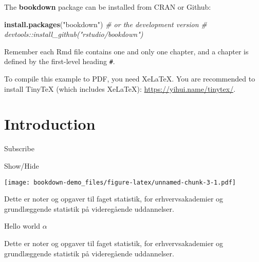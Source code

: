 \documentclass[]{book}
\newenvironment{Shaded}{\begin{snugshade}}{\end{snugshade}}
\newcommand{\CommentTok}[1]{\textcolor[rgb]{0.56,0.35,0.01}{\textit{#1}}}
\newcommand{\KeywordTok}[1]{\textcolor[rgb]{0.13,0.29,0.53}{\textbf{#1}}}
\newcommand{\NormalTok}[1]{#1}
\newcommand{\OperatorTok}[1]{\textcolor[rgb]{0.81,0.36,0.00}{\textbf{#1}}}
\newcommand{\StringTok}[1]{\textcolor[rgb]{0.31,0.60,0.02}{#1}}
\theoremstyle{definition}
\theoremstyle{definition}
\theoremstyle{definition}
\theoremstyle{remark}
\begin{document}
The \textbf{bookdown} package can be installed from CRAN or Github:

\begin{Shaded}
\begin{Highlighting}[]
\KeywordTok{install.packages}\NormalTok{(}\StringTok{"bookdown"}\NormalTok{)}
\CommentTok{# or the development version}
\CommentTok{# devtools::install_github("rstudio/bookdown")}
\end{Highlighting}
\end{Shaded}

Remember each Rmd file contains one and only one chapter, and a chapter
is defined by the first-level heading \texttt{\#}.

To compile this example to PDF, you need XeLaTeX. You are recommended to
install TinyTeX (which includes XeLaTeX):
\url{https://yihui.name/tinytex/}.

\hypertarget{intro}{%
\chapter{Introduction}\label{intro}}

Subscribe

Show/Hide

\hypertarget{BlockName}{}
\begin{Shaded}
\end{Shaded}

\texttt{[image: bookdown-demo\_files/figure-latex/unnamed-chunk-3-1.pdf]}

Dette er noter og opgaver til faget statistik, for erhvervsakademier og
grundlæggende statistik på videregående uddannelser.

\leavevmode\hypertarget{BlockName3}{}%
Hello world \(\alpha\)

Dette er noter og opgaver til faget statistik, for erhvervsakademier og
grundlæggende statistik på videregående uddannelser.
\end{document}
